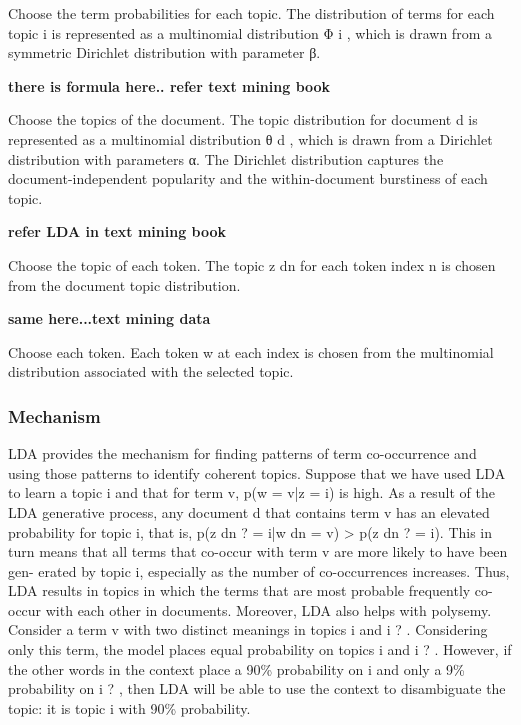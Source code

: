 Choose the term probabilities for each topic. The distribution of terms for each topic i is represented as a multinomial
distribution Φ i , which is drawn from a symmetric Dirichlet distribution with parameter β.

\textbf{there is formula here.. refer text mining book}

Choose the topics of the document. The topic distribution for document d is represented as a multinomial distribution θ d , which is drawn from a Dirichlet distribution with parameters α. The Dirichlet distribution captures the document-independent popularity and the within-document burstiness of each topic.

\textbf{refer LDA in text mining book}

Choose the topic of each token. The topic z dn for each token index n is chosen from the document topic distribution.

\textbf{same here...text mining data}

Choose each token. Each token w at each index is chosen from the multinomial distribution associated with the selected topic.


\subsubsection{Mechanism} LDA provides the mechanism for finding patterns of term co-occurrence and using those patterns to identify coherent topics. Suppose that we have used LDA to learn a topic i and that for term v, p(w = v|z = i) is high. As a result of the LDA generative process, any document d that contains term v has an elevated probability for topic i, that is, p(z dn ? = i|w dn = v) > p(z dn ? = i). This in turn means that all terms that co-occur with term v are more likely to have been gen- erated by topic i, especially as the number of co-occurrences increases. Thus, LDA results in topics in which the terms that are most probable frequently co-occur with each other in documents. Moreover, LDA also helps with polysemy. Consider a term v with two distinct meanings in topics i and i ? . Considering only this term, the model places equal probability on topics i and i ? . However, if the other words in the context place a 90\% probability on i and only a 9\% probability on i ? , then LDA will be able to use the context to disambiguate the topic: it is topic i with 90\% probability.

